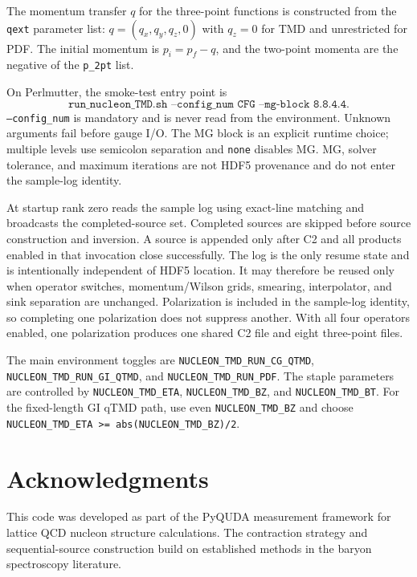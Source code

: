 \documentclass[11pt,a4paper]{article}
\begin{document}
The momentum transfer $q$ for the three-point functions is constructed from the
\texttt{qext} parameter list: $q = (q_x, q_y, q_z, 0)$ with $q_z = 0$ for TMD
and unrestricted for PDF. The initial momentum is $p_i = p_f - q$, and the
two-point momenta are the negative of the \texttt{p\_2pt} list.

On Perlmutter, the smoke-test entry point is
\begin{equation}
  \texttt{run\_nucleon\_TMD.sh --config\_num CFG
  --mg-block 8.8.4.4}.
\end{equation}
\texttt{--config\_num} is mandatory and is never read from the environment.
Unknown arguments fail before gauge I/O.  The MG block is an explicit runtime
choice; multiple levels use semicolon separation and \texttt{none} disables
MG.  MG, solver tolerance, and maximum iterations are not HDF5 provenance and
do not enter the sample-log identity.

At startup rank zero reads the sample log using exact-line matching and
broadcasts the completed-source set.  Completed sources are skipped before
source construction and inversion.  A source is appended only after C2 and
all products enabled in that invocation close successfully.  The log is the
only resume state and is intentionally independent of HDF5 location.  It may
therefore be reused only when operator switches, momentum/Wilson grids,
smearing, interpolator, and sink separation are unchanged.
Polarization is included in the sample-log identity, so completing one
polarization does not suppress another.  With all four operators enabled, one
polarization produces one shared C2 file and eight three-point files.

The main environment toggles are
\texttt{NUCLEON\_TMD\_RUN\_CG\_QTMD},
\texttt{NUCLEON\_TMD\_RUN\_GI\_QTMD}, and
\texttt{NUCLEON\_TMD\_RUN\_PDF}.  The staple parameters are controlled by
\texttt{NUCLEON\_TMD\_ETA}, \texttt{NUCLEON\_TMD\_BZ}, and
\texttt{NUCLEON\_TMD\_BT}.  For the fixed-length GI qTMD path, use even
\texttt{NUCLEON\_TMD\_BZ} and choose
\texttt{NUCLEON\_TMD\_ETA >= abs(NUCLEON\_TMD\_BZ)/2}.

\section*{Acknowledgments}

This code was developed as part of the PyQUDA measurement framework for lattice QCD
nucleon structure calculations. The contraction strategy and sequential-source
construction build on established methods in the baryon spectroscopy literature.
\end{document}
